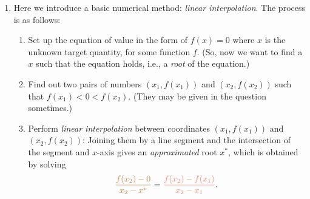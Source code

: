 \begin{enumerate}
\item Here we introduce a basic numerical method: \emph{linear interpolation}.
The process is as follows:
\begin{enumerate}
\item Set up the equation of value in the form of \(f(x)=0\) where \(x\) is the
unknown target quantity, for some function \(f\). (So, now we want to find
a \(x\) such that the equation holds, i.e., a \emph{root} of the equation.)
\item Find out two pairs of numbers \((x_1,f(x_1))\) and \((x_2,f(x_2))\) such
that \(f(x_1)<0<f(x_2)\). (They may be given in the question sometimes.)
\item Perform \emph{linear interpolation} between coordinates \((x_1,f(x_1))\)
and \((x_2,f(x_2))\): Joining them by a line segment and the intersection of
the segment and \(x\)-axis gives an \emph{approximated} root \(x^*\), which is
obtained by solving
\[
{\color{brown}\frac{f(x_2)-0}{x_2-x^*}}={\color{Salmon}\frac{f(x_2)-f(x_1)}{x_2-x_1}}.
\]
\begin{center}
\end{center}
\end{enumerate}
\end{enumerate}
